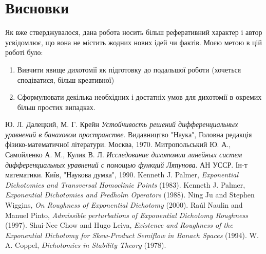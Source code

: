 \documentclass[14pt]{extarticle} %
\begin{document}
\section{Висновки}
Як вже стверджувалося, дана робота носить більш реферативний характер і автор усвідомлює, що вона не містить жодних нових ідей чи фактів.
Моєю метою в цій роботі було:
\begin{enumerate}
	\item{Вивчити явище дихотомії як підготовку до подальшої роботи (хочеться сподіватися, більш креативної)
		}
	\item{Сформулювати декілька необхідних і достатніх умов для дихотомії в окремих більш простих випадках.}
\end{enumerate}
\begin{thebibliography}{9}
Ю. Л. Далецкий, М. Г. Крейн
\emph{Устойчивость решений дифференциальных уравнений в банаховом пространстве}.
Видавництво "Наука"{}, Головна редакція фізико-математичної літератури. Москва, 1970.
Митропольський Ю. А., Самойленко А. М., Кулик В. Л.
\emph{Исследование дихотомии линейных систем дифференциальных уравнений с помощью функций Ляпунова}.
АН УССР. Ін-т математики. Київ, "Наукова думка", 1990.
	Kenneth J. Palmer, {\em Exponential Dichotomies and Transversal Homoclinic Points} (1983).
	Kenneth J. Palmer, {\em Exponential Dichotomies and Fredholm Operators} (1988).
	Ning Ju and Stephen Wiggins, {\em On Roughness of Exponential Dichotomy} (2000).
	Ra\'ul Naulin and Manuel Pinto, {\em Admissible perturbations of Exponential Dichotomy Roughness} (1997).
	Shui-Nee Chow and Hugo Leiva, {\em Existence and Roughness of the Exponential Dichotomy for Skew-Product Semiflow in Banach Spaces} (1994).
	W. A. Coppel, {\em Dichotomies in Stability Theory} (1978).
\end{thebibliography}
\end{document}
